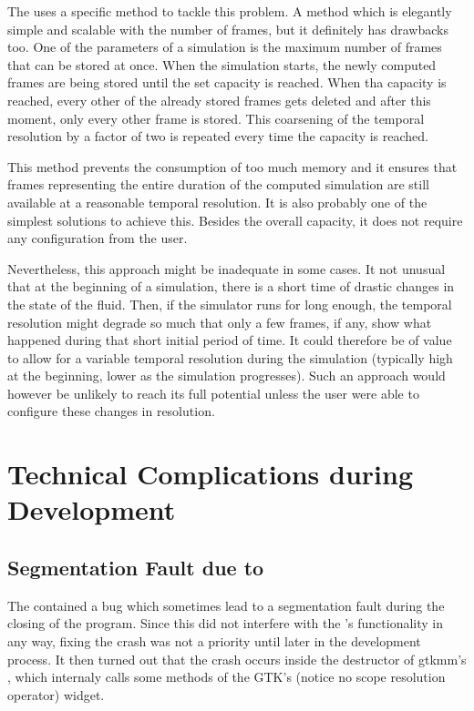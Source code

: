 \documentclass[11pt,a4paper,twoside,openright]{report}
\begin{document}
The \software{} uses a specific method to tackle this problem. A method which is elegantly simple and scalable with the number of frames, but it definitely has drawbacks too. One of the parameters of a simulation is the maximum number of frames that can be stored at once. When the simulation starts, the newly computed frames are being stored until the set capacity is reached. When tha capacity is reached, every other of the already stored frames gets deleted and after this moment, only every other frame is stored. This coarsening of the temporal resolution by a factor of two is repeated every time the capacity is reached.

This method prevents the consumption of too much memory and it ensures that frames representing the entire duration of the computed simulation are still available at a reasonable temporal resolution. It is also probably one of the simplest solutions to achieve this. Besides the overall capacity, it does not require any configuration from the user.

Nevertheless, this approach might be inadequate in some cases. It not unusual that at the beginning of a simulation, there is a short time of drastic changes in the state of the fluid. Then, if the simulator runs for long enough, the temporal resolution might degrade so much that only a few frames, if any, show what happened during that short initial period of time. It could therefore be of value to allow for a variable temporal resolution during the simulation (typically high at the beginning, lower as the simulation progresses). Such an approach would however be unlikely to reach its full potential unless the user were able to configure these changes in resolution.

\section{Technical Complications during Development}

\subsection{Segmentation Fault due to }

The \software{} contained a bug which sometimes lead to a segmentation fault during the closing of the program. Since this did not interfere with the \software{}'s functionality in any way, fixing the crash was not a priority until later in the development process. It then turned out that the crash occurs inside the destructor of gtkmm's , which internaly calls some methods of the GTK's  (notice no scope resolution operator) widget.
\end{document}
